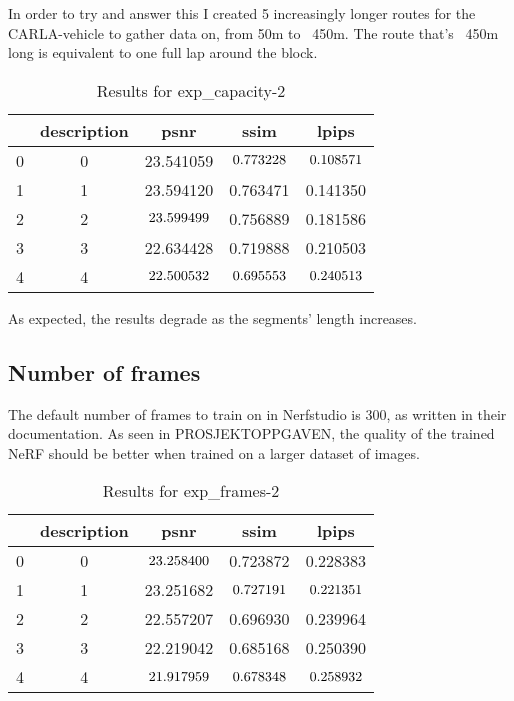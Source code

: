 In order to try and answer this I created 5 increasingly longer routes for the CARLA-vehicle to gather data on, from 50m to ~450m. The route that's ~450m long is equivalent to one full lap around the block.

\begin{table}[ht]
\centering
\begin{tabular}{|l|c|c|c|c|}
\hline
  & description & psnr & ssim & lpips \\
\hline
0 & 0 & 23.541059 & $\cellcolor{green} 0.773228$ & $\cellcolor{green} 0.108571$ \\
\cline{1-5}
1 & 1 & 23.594120 & 0.763471 & 0.141350 \\
\cline{1-5}
2 & 2 & $\cellcolor{green} 23.599499$ & 0.756889 & 0.181586 \\
\cline{1-5}
3 & 3 & 22.634428 & 0.719888 & 0.210503 \\
\cline{1-5}
4 & 4 & $\cellcolor{red} 22.500532$ & $\cellcolor{red} 0.695553$ & $\cellcolor{red} 0.240513$ \\
\cline{1-5}
\end{tabular}
\caption{Results for exp\_capacity-2}
\label{tab:exp_capacity-2}
\end{table}

As expected, the results degrade as the segments' length increases.



\subsection{Number of frames}
The default number of frames to train on in Nerfstudio is 300, as written in their documentation. As seen in PROSJEKTOPPGAVEN, the quality of the trained NeRF should be better when trained on a larger dataset of images.

\begin{table}[ht]
\centering
\begin{tabular}{|l|c|c|c|c|}
\hline
& description & psnr & ssim & lpips \\
\hline
0 & 0 & $\cellcolor{green} 23.258400$ & 0.723872 & 0.228383 \\
\cline{1-5}
1 & 1 & 23.251682 & $\cellcolor{green} 0.727191$ & $\cellcolor{green} 0.221351$ \\
\cline{1-5}
2 & 2 & 22.557207 & 0.696930 & 0.239964 \\
\cline{1-5}
3 & 3 & 22.219042 & 0.685168 & 0.250390 \\
\cline{1-5}
4 & 4 & $\cellcolor{red} 21.917959$ & $\cellcolor{red} 0.678348$ & $\cellcolor{red} 0.258932$ \\
\cline{1-5}
\end{tabular}
\caption{Results for exp\_frames-2}
\label{tab:exp_frames-2}
\end{table}

